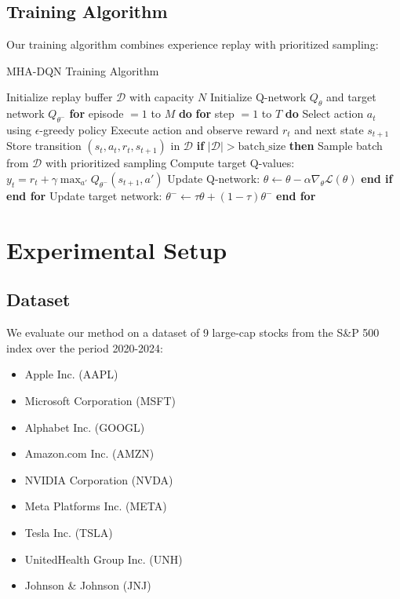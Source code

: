 \documentclass[11pt]{article}
\begin{document}
\subsection{Training Algorithm}

Our training algorithm combines experience replay with prioritized sampling:

\begin{algorithm}
\caption{MHA-DQN Training Algorithm}
\begin{algorithmic}[1]
\STATE Initialize replay buffer $\mathcal{D}$ with capacity $N$
\STATE Initialize Q-network $Q_\theta$ and target network $Q_{\theta^-}$
\STATE \textbf{for} episode $= 1$ to $M$ \textbf{do}
\STATE \quad \textbf{for} step $= 1$ to $T$ \textbf{do}
\STATE \quad \quad Select action $a_t$ using $\epsilon$-greedy policy
\STATE \quad \quad Execute action and observe reward $r_t$ and next state $s_{t+1}$
\STATE \quad \quad Store transition $(s_t, a_t, r_t, s_{t+1})$ in $\mathcal{D}$
\STATE \quad \quad \textbf{if} $|\mathcal{D}| > \text{batch\_size}$ \textbf{then}
\STATE \quad \quad \quad Sample batch from $\mathcal{D}$ with prioritized sampling
\STATE \quad \quad \quad Compute target Q-values: $y_t = r_t + \gamma \max_{a'} Q_{\theta^-}(s_{t+1}, a')$
\STATE \quad \quad \quad Update Q-network: $\theta \leftarrow \theta - \alpha \nabla_\theta \mathcal{L}(\theta)$
\STATE \quad \quad \textbf{end if}
\STATE \quad \textbf{end for}
\STATE \quad Update target network: $\theta^- \leftarrow \tau \theta + (1-\tau) \theta^-$
\STATE \textbf{end for}
\end{algorithmic}
\end{algorithm}

\section{Experimental Setup}

\subsection{Dataset}

We evaluate our method on a dataset of 9 large-cap stocks from the S\&P 500 index over the period 2020-2024:
\begin{itemize}
    \item Apple Inc. (AAPL)
    \item Microsoft Corporation (MSFT)
    \item Alphabet Inc. (GOOGL)
    \item Amazon.com Inc. (AMZN)
    \item NVIDIA Corporation (NVDA)
    \item Meta Platforms Inc. (META)
    \item Tesla Inc. (TSLA)
    \item UnitedHealth Group Inc. (UNH)
    \item Johnson \& Johnson (JNJ)
\end{itemize}
\end{document}
